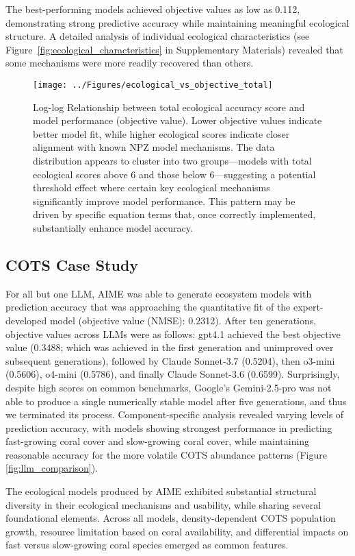 The best-performing models achieved objective values as low as 0.112, demonstrating strong predictive accuracy while maintaining meaningful ecological structure. A detailed analysis of individual ecological characteristics (see Figure~\ref{fig:ecological_characteristics} in Supplementary Materials) revealed that some mechanisms were more readily recovered than others.

\begin{figure}[H]
\centering
\texttt{[image: ../Figures/ecological\_vs\_objective\_total]}
\caption{Log-log Relationship between total ecological accuracy score and model performance (objective value). Lower objective values indicate better model fit, while higher ecological scores indicate closer alignment with known NPZ model mechanisms. The data distribution appears to cluster into two groups—models with total ecological scores above 6 and those below 6—suggesting a potential threshold effect where certain key ecological mechanisms significantly improve model performance. This pattern may be driven by specific equation terms that, once correctly implemented, substantially enhance model accuracy.}
\label{fig:ecological_total}
\end{figure}

\subsection{COTS Case Study}
\label{sec:cots_data}
For all but one LLM, AIME was able to generate ecosystem models with prediction accuracy that was approaching the quantitative fit of the expert-developed model (objective value (NMSE): 0.2312). After ten generations, objective values across LLMs were as follows: gpt4.1 achieved the best objective value (0.3488; which was achieved in the first generation and unimproved over subsequent generations), followed by Claude Sonnet-3.7 (0.5204), then o3-mini (0.5606), o4-mini (0.5786), and finally Claude Sonnet-3.6 (0.6599). Surprisingly, despite high scores on common benchmarks, Google's Gemini-2.5-pro was not able to produce a single numerically stable model after five generations, and thus we terminated its process. Component-specific analysis revealed varying levels of prediction accuracy, with models showing strongest performance in predicting fast-growing coral cover and slow-growing coral cover, while maintaining reasonable accuracy for the more volatile COTS abundance patterns (Figure \ref{fig:llm_comparison}).

The ecological models produced by AIME exhibited substantial structural diversity in their ecological mechanisms and usability, while sharing several foundational elements. Across all models, density-dependent COTS population growth, resource limitation based on coral availability, and differential impacts on fast versus slow-growing coral species emerged as common features.

